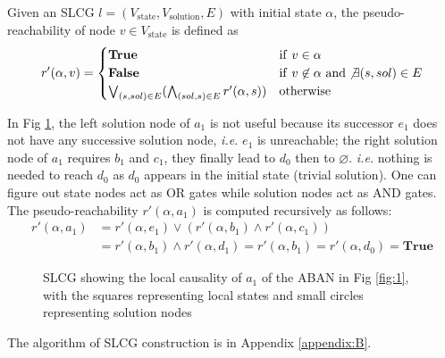 \documentclass[runningheads]{llncs}
\begin{document}
\begin{definition}\label{defPseudoReach}
Given an SLCG $l=(V_{\mathrm{state}},V_{\mathrm{solution}},E)$ with initial state $\alpha$, the pseudo-reachability of node $v\in V_{\mathrm{state}}$ is defined as
\begin{equation}
\nonumber
    r'(\alpha,v)=
    \begin{cases}
    \mathrm{\bf True} & {\rm if\ } v\in \alpha\\
    \mathrm{\bf False} & {\rm if\ } v\not\in \alpha\ {\rm and} \not\exists(s,sol) \in E\\
    \bigvee_{(s,sol) \in E} (\bigwedge_{(sol,s)\in E} r'(\alpha,s)) & {\rm otherwise}
\end{cases}
\end{equation}

\end{definition}
\begin{example}
In Fig \ref{fig:2}, the left solution node of $a_1$ is not useful because its successor $e_1$ does not have any successive solution node, \textit{i.e.} $e_1$ is unreachable;
the right solution node of $a_1$ requires $b_1$ and $c_1$, they finally lead to $d_0$ then to $\varnothing$.
\textit{i.e.} nothing is needed to reach $d_0$ as $d_0$ appears in the initial state (trivial solution).
One can figure out state nodes act as OR gates while solution nodes act as AND gates. The pseudo-reachability $r'(\alpha,a_1)$ is computed recursively as follows:
\begin{align*}
r'(\alpha,a_1)&=r'(\alpha,e_1)\lor(r'(\alpha,b_1)\land r'(\alpha,c_1))\\
&=r'(\alpha,b_1)\land r'(\alpha,d_1)=r'(\alpha,b_1)=r'(\alpha,d_0)=\mathbf{True}
\end{align*}
\end{example}

\begin{figure}[ht]
\centering

\caption{SLCG showing the local causality of $a_1$ of the ABAN in Fig \ref{fig:1}, with the squares representing local states and small circles representing solution nodes}
\label{fig:2}
\end{figure}

The algorithm of SLCG construction is in Appendix \ref{appendix:B}.
\end{document}
